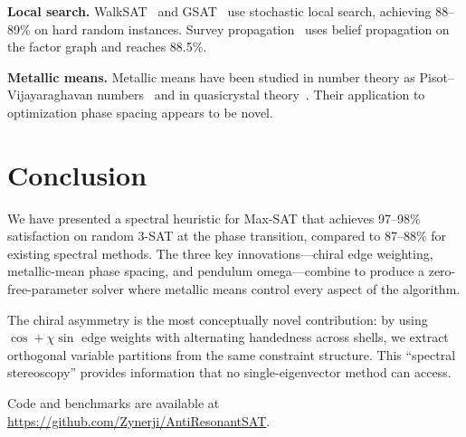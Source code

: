 \documentclass[11pt,a4paper]{article}
\begin{document}
\textbf{Local search.}
WalkSAT~\cite{selman1994noise} and GSAT~\cite{selman1992new} use
stochastic local search, achieving 88--89\% on hard random instances.
Survey propagation~\cite{braunstein2005survey} uses belief propagation
on the factor graph and reaches 88.5\%.

\textbf{Metallic means.}
Metallic means have been studied in number theory as Pisot--Vijayaraghavan
numbers~\cite{adamczewski2007pisot} and in quasicrystal
theory~\cite{steinhardt1998experimental}. Their application to
optimization phase spacing appears to be novel.

\section{Conclusion}

We have presented a spectral heuristic for Max-SAT that achieves
97--98\% satisfaction on random 3-SAT at the phase transition, compared
to 87--88\% for existing spectral methods. The three key innovations---chiral
edge weighting, metallic-mean phase spacing, and pendulum
omega---combine to produce a zero-free-parameter solver where metallic
means control every aspect of the algorithm.

The chiral asymmetry is the most conceptually novel contribution:
by using $\cos + \chi\sin$ edge weights with alternating handedness
across shells, we extract orthogonal variable partitions from
the same constraint structure. This ``spectral stereoscopy'' provides
information that no single-eigenvector method can access.

Code and benchmarks are available at
\url{https://github.com/Zynerji/AntiResonantSAT}.
\end{document}
